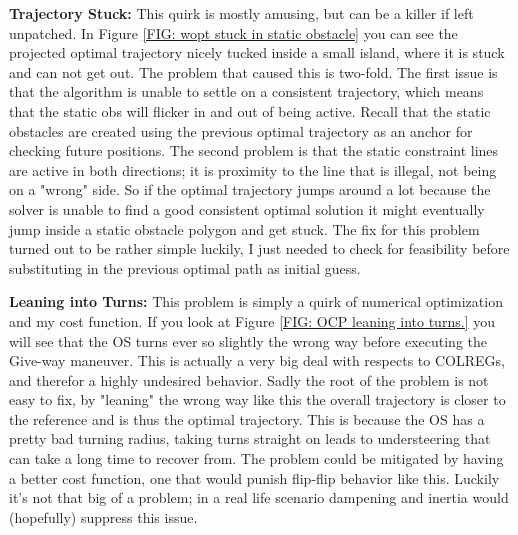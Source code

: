 \textbf{Trajectory Stuck:}\newline
This quirk is mostly amusing, but can be a killer if left unpatched. In Figure \ref{FIG: wopt stuck in static obstacle} you can
see the projected optimal trajectory nicely tucked inside a small island, where it is stuck and can not get out. The problem that caused
this is two-fold. The first issue is that the algorithm is unable to settle on a consistent trajectory, which means that the static obs
will flicker in and out of being active. Recall that the static obstacles are created using the previous optimal trajectory as an
anchor for checking future positions. The second problem is that the static constraint lines are active in both directions; it is proximity
to the line that is illegal, not being on a "wrong" side. So if the optimal trajectory jumps around a lot because the solver is unable
to find a good consistent optimal solution it might eventually jump inside a static obstacle polygon and get stuck. The fix for this
problem turned out to be rather simple luckily, I just needed to check for feasibility before substituting in the previous
optimal path as initial guess.

\textbf{Leaning into Turns:}\newline
This problem is simply a quirk of numerical optimization and my cost function. If you look at Figure \ref{FIG: OCP leaning into turns.}
you will see that the OS turns ever so slightly the wrong way before executing the Give-way maneuver. This is actually a very big deal with
respects to COLREGs, and therefor a highly undesired behavior. Sadly the root of the problem is not easy to fix, by "leaning" the wrong way
like this the overall trajectory is closer to the reference and is thus the optimal trajectory. This is because the OS has a pretty
bad turning radius, taking turns straight on leads to understeering that can take a long time to recover from. The problem could
be mitigated by having a better cost function, one that would punish flip-flip behavior like this. Luckily it's not that big of a problem; 
in a real life scenario dampening and inertia would (hopefully) suppress this issue.


